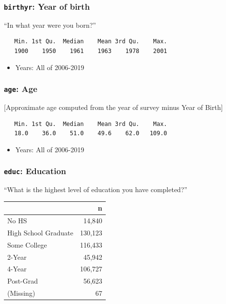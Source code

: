 \documentclass[10pt,article,oneside]{memoir}
\theoremstyle{definition}
\begin{document}
\hypertarget{birthyr-year-of-birth}{%
\subsubsection{\texorpdfstring{\texttt{birthyr}: Year of
birth}{birthyr: Year of birth}}\label{birthyr-year-of-birth}}

``In what year were you born?''

\begin{verbatim}
   Min. 1st Qu.  Median    Mean 3rd Qu.    Max. 
   1900    1950    1961    1963    1978    2001 
\end{verbatim}

\begin{itemize}
\tightlist
\item
  Years: All of 2006-2019
\end{itemize}

\hypertarget{age-age}{%
\subsubsection{\texorpdfstring{\texttt{age}:
Age}{age: Age}}\label{age-age}}

{[}Approximate age computed from the year of survey minus Year of
Birth{]}

\begin{verbatim}
   Min. 1st Qu.  Median    Mean 3rd Qu.    Max. 
   18.0    36.0    51.0    49.6    62.0   109.0 
\end{verbatim}

\begin{itemize}
\tightlist
\item
  Years: All of 2006-2019
\end{itemize}

\hypertarget{educ-education}{%
\subsubsection{\texorpdfstring{\texttt{educ}:
Education}{educ: Education}}\label{educ-education}}

``What is the highest level of education you have completed?''

\begin{table}[H]
\centering
\begin{tabular}{lr}
\toprule
 & n\\
\midrule
No HS & 14,840\\
High School Graduate & 130,123\\
Some College & 116,433\\
2-Year & 45,942\\
4-Year & 106,727\\
Post-Grad & 56,623\\
(Missing) & 67\\
\bottomrule
\end{tabular}
\end{table}
\end{document}
